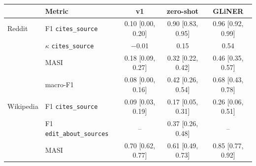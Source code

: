 \begin{tabular}{llccc}
\toprule
 & Metric & v1 & zero-shot & GLiNER \\
\midrule
Reddit & F1 \texttt{cites\_source} & 0.10 {\scriptsize [0.00, 0.20]} & 0.90 {\scriptsize [0.83, 0.95]} & 0.96 {\scriptsize [0.92, 0.99]} \\
 & $\kappa$ \texttt{cites\_source} & $-$0.01 & 0.15 & 0.54 \\
 & MASI & 0.18 {\scriptsize [0.09, 0.27]} & 0.32 {\scriptsize [0.22, 0.42]} & 0.46 {\scriptsize [0.35, 0.57]} \\
 & macro-F1 & 0.08 {\scriptsize [0.00, 0.16]} & 0.42 {\scriptsize [0.26, 0.54]} & 0.68 {\scriptsize [0.43, 0.78]} \\
\midrule
Wikipedia & F1 \texttt{cites\_source} & 0.09 {\scriptsize [0.03, 0.19]} & 0.17 {\scriptsize [0.05, 0.31]} & 0.26 {\scriptsize [0.06, 0.51]} \\
 & F1 \texttt{edit\_about\_sources} & -- & 0.37 {\scriptsize [0.26, 0.48]} & -- \\
 & MASI & 0.70 {\scriptsize [0.62, 0.77]} & 0.61 {\scriptsize [0.49, 0.73]} & 0.85 {\scriptsize [0.77, 0.92]} \\
\bottomrule
\end{tabular}
